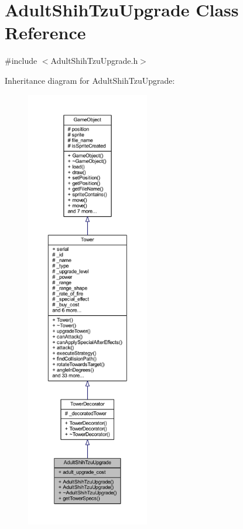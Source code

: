 \hypertarget{class_adult_shih_tzu_upgrade}{\section{Adult\+Shih\+Tzu\+Upgrade Class Reference}
\label{class_adult_shih_tzu_upgrade}
}


{\ttfamily \#include $<$Adult\+Shih\+Tzu\+Upgrade.\+h$>$}



Inheritance diagram for Adult\+Shih\+Tzu\+Upgrade\+:
\nopagebreak
\begin{figure}[H]
\begin{center}
\leavevmode
\includegraphics[height=550pt]{class_adult_shih_tzu_upgrade__inherit__graph}
\end{center}
\end{figure}



